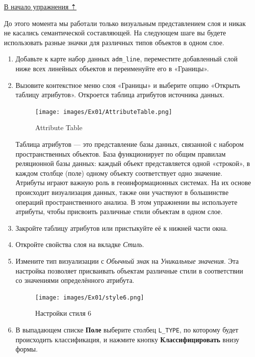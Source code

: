\documentclass[
  12pt,
]{book}
\begin{document}
\protect\hyperlink{map-design-general}{В начало упражнения ⇡}

До этого момента мы работали только визуальным представлением слоя и никак не касались семантической составляющей. На следующем шаге вы будете использовать разные значки для различных типов объектов в одном слое.

\begin{enumerate}
\def\labelenumi{\arabic{enumi}.}
\item
  Добавьте к карте набор данных \texttt{adm\_line}, переместите добавленный слой ниже всех линейных объектов и переименуйте его в «Границы».
\item
  Вызовите контекстное меню слоя «Границы» и выберите опцию «Открыть таблицу атрибутов». Откроется таблица атрибутов источника данных.

  \begin{figure}
  \centering
  \texttt{[image: images/Ex01/AttributeTable.png]}
  \caption{Attribute Table}
  \end{figure}

  Таблица атрибутов --- это представление базы данных, связанной с набором пространственных объектов. База функционирует по общим правилам реляционной базы данных: каждый объект представляется одной «строкой», в каждом столбце (поле) одному объекту соответствует одно значение. Атрибуты играют важную роль в геоинформационных системах. На их основе происходит визуализация данных, также они участвуют в большинстве операций пространственного анализа. В этом упражнении вы используете атрибуты, чтобы присвоить различные стили объектам в одном слое.
\item
  Закройте таблицу атрибутов или пристыкуйте её к нижней части окна.
\item
  Откройте свойства слоя на вкладке \emph{Стиль}.
\item
  Измените тип визуализации с \emph{Обычный знак} на \emph{Уникальные значения}. Эта настройка позволяет присваивать объектам различные стили в соответствии со значениями определённого атрибута.

  \begin{figure}
  \centering
  \texttt{[image: images/Ex01/style6.png]}
  \caption{Настройки стиля 6}
  \end{figure}
\item
  В выпадающем списке \textbf{Поле} выберите столбец \texttt{L\_TYPE}, по которому будет происходить классификация, и нажмите кнопку \textbf{Классифицировать} внизу формы.


\end{enumerate}
\end{document}
